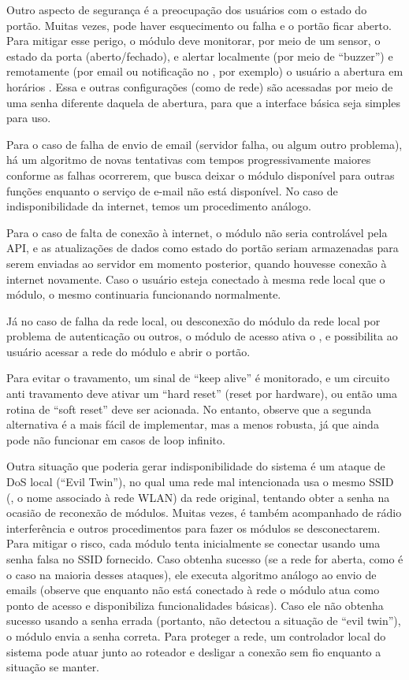 Outro aspecto de segurança é a preocupação dos usuários com o estado do portão. Muitas vezes, pode haver esquecimento ou falha e o portão ficar aberto. Para mitigar esse perigo, o módulo deve monitorar, por meio de um sensor, o estado da porta (aberto/fechado), e alertar localmente (por meio de “buzzer”) e remotamente (por email ou notificação no , por exemplo) o usuário a abertura em horários . Essa e outras configurações (como de rede) são acessadas por meio de uma senha diferente daquela de abertura, para que a interface básica seja simples para uso.

Para o caso de falha de envio de email (servidor falha, ou algum outro problema), há um algoritmo de novas tentativas com tempos progressivamente maiores conforme as falhas ocorrerem, que busca deixar o módulo disponível para outras funções enquanto o serviço de e-mail não está disponível. No caso de indisponibilidade da internet, temos um procedimento análogo.

Para o caso de falta de conexão à internet, o módulo não seria controlável pela API, e as atualizações de dados como estado do portão seriam armazenadas para serem enviadas ao servidor em momento posterior, quando houvesse conexão à internet novamente. Caso o usuário esteja conectado à mesma rede local que o módulo, o mesmo continuaria funcionando normalmente.

Já no caso de falha da rede local, ou desconexão do módulo da rede local por problema de autenticação ou outros, o módulo de acesso ativa o , e possibilita ao usuário acessar a rede do módulo e abrir o portão.

Para evitar o travamento, um sinal de “keep alive” é monitorado, e um circuito anti travamento deve ativar um “hard reset” (reset por hardware), ou então uma rotina de “soft reset” deve ser acionada. No entanto, observe que a segunda alternativa é a mais fácil de implementar, mas a menos robusta, já que ainda pode não funcionar em casos de loop infinito.

Outra situação que poderia gerar indisponibilidade do sistema é um ataque de DoS local (“Evil Twin”), no qual uma rede mal intencionada usa o mesmo SSID (, o nome associado à rede WLAN) da rede original, tentando obter a senha na ocasião de reconexão de módulos. Muitas vezes, é também acompanhado de rádio interferência e outros procedimentos para fazer os módulos se desconectarem. Para mitigar o risco, cada módulo tenta inicialmente se conectar usando uma senha falsa no SSID fornecido. Caso obtenha sucesso (se a rede for aberta, como é o caso na maioria desses ataques), ele executa algoritmo análogo ao envio de emails (observe que enquanto não está conectado à rede o módulo atua como ponto de acesso e disponibiliza funcionalidades básicas). Caso ele não obtenha sucesso usando a senha errada (portanto, não detectou a situação de “evil twin”), o módulo envia a senha correta. Para proteger a rede, um controlador local do sistema pode atuar junto ao roteador e desligar a conexão sem fio enquanto a situação se manter.

